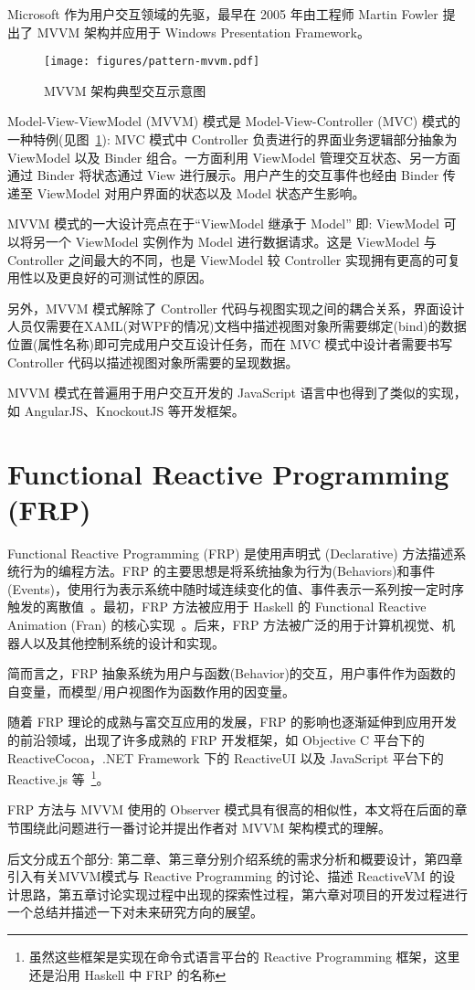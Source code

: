 Microsoft 作为用户交互领域的先驱，最早在 2005 年由工程师 Martin Fowler 提出了 MVVM 架构并应用于 Windows Presentation Framework。

\begin{figure}[!h]
\begin{center}
\texttt{[image: figures/pattern-mvvm.pdf]}
\caption{MVVM 架构典型交互示意图\label{MVVMOverview}}
\end{center}
\end{figure}

Model-View-ViewModel (MVVM) 模式是 Model-View-Controller (MVC) 模式的一种特例(见图~\ref{MVVMOverview}): MVC 模式中 Controller 负责进行的界面业务逻辑部分抽象为 ViewModel 以及 Binder 组合。一方面利用 ViewModel 管理交互状态、另一方面通过 Binder 将状态通过 View 进行展示。用户产生的交互事件也经由 Binder 传递至 ViewModel 对用户界面的状态以及 Model 状态产生影响。

MVVM 模式的一大设计亮点在于“ViewModel 继承于 Model” 即: ViewModel 可以将另一个 ViewModel 实例作为 Model 进行数据请求。这是 ViewModel 与 Controller 之间最大的不同，也是 ViewModel 较 Controller 实现拥有更高的可复用性以及更良好的可测试性的原因。

另外，MVVM 模式解除了 Controller 代码与视图实现之间的耦合关系，界面设计人员仅需要在XAML(对WPF的情况)文档中描述视图对象所需要绑定(bind)的数据位置(属性名称)即可完成用户交互设计任务，而在 MVC 模式中设计者需要书写 Controller 代码以描述视图对象所需要的呈现数据。

MVVM 模式在普遍用于用户交互开发的 JavaScript 语言中也得到了类似的实现，如 AngularJS、KnockoutJS 等开发框架。

\section{Functional Reactive Programming (FRP)}

Functional Reactive Programming (FRP) 是使用声明式 (Declarative) 方法描述系统行为的编程方法。FRP 的主要思想是将系统抽象为行为(Behaviors)和事件(Events)，使用行为表示系统中随时域连续变化的值、事件表示一系列按一定时序触发的离散值~\cite{Wan:2000:FRP:358438.349331}。最初，FRP 方法被应用于 Haskell 的 Functional Reactive Animation (Fran) 的核心实现~\cite{Elliott:1997:FRA:258949.258973}。后来，FRP 方法被广泛的用于计算机视觉、机器人以及其他控制系统的设计和实现。

简而言之，FRP 抽象系统为用户与函数(Behavior)的交互，用户事件作为函数的自变量，而模型/用户视图作为函数作用的因变量。

随着 FRP 理论的成熟与富交互应用的发展，FRP 的影响也逐渐延伸到应用开发的前沿领域，出现了许多成熟的 FRP 开发框架，如 Objective C 平台下的 ReactiveCocoa，.NET Framework 下的 ReactiveUI 以及 JavaScript 平台下的 Reactive.js 等~\footnote{虽然这些框架是实现在命令式语言平台的 Reactive Programming 框架，这里还是沿用 Haskell 中 FRP 的名称}。

FRP 方法与 MVVM 使用的 Observer 模式具有很高的相似性，本文将在后面的章节围绕此问题进行一番讨论并提出作者对 MVVM 架构模式的理解。

后文分成五个部分: 第二章、第三章分别介绍系统的需求分析和概要设计，第四章引入有关MVVM模式与 Reactive Programming 的讨论、描述 ReactiveVM 的设计思路，第五章讨论实现过程中出现的探索性过程，第六章对项目的开发过程进行一个总结并描述一下对未来研究方向的展望。

